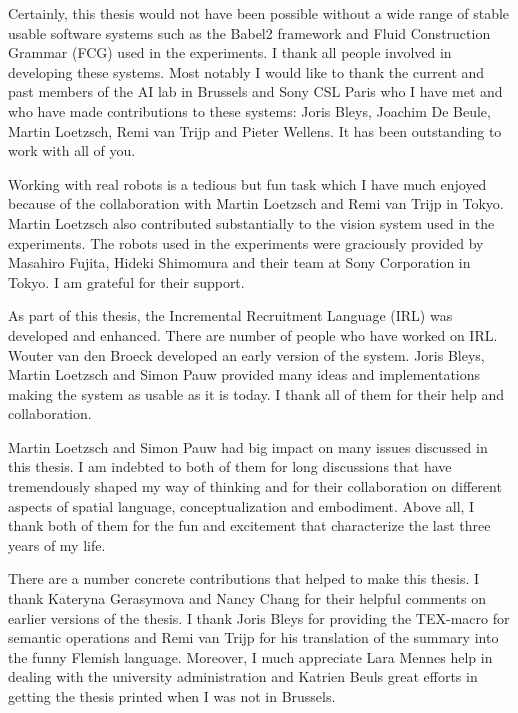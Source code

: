 

Certainly, this thesis would not have been possible without a
wide range of stable usable software systems such as
the Babel2 framework and Fluid Construction Grammar (FCG)
used in the experiments. I thank all people involved in developing these
systems. Most notably I would like to thank the current and past members
of the AI lab in Brussels and Sony CSL Paris who I have met
and who have made contributions to these systems: Joris Bleys,
Joachim De Beule, Martin Loetzsch, Remi van Trijp and Pieter Wellens. 
It has been outstanding to work with all of you.

Working with real robots is a tedious but fun task which I have 
much enjoyed because of the collaboration with Martin Loetzsch 
and Remi van Trijp in Tokyo. Martin Loetzsch also contributed
substantially to the vision system used in the experiments.
The robots used in the experiments were graciously provided
by Masahiro Fujita, Hideki Shimomura and their team at
Sony Corporation in Tokyo. I am grateful for their support.

As part of this thesis, the Incremental Recruitment Language (IRL) 
was developed and enhanced. There are number of people who have 
worked on IRL. Wouter van den Broeck developed an early version of the system.
Joris Bleys, Martin Loetzsch and Simon Pauw provided many
ideas and implementations making the system as usable as it is today.
I thank all of them for their help and collaboration.

Martin Loetzsch and Simon Pauw had big impact
on many issues discussed in this thesis. I am indebted to both
of them for long discussions that have tremendously shaped my way of thinking 
and for their collaboration on different aspects of spatial language, 
conceptualization and embodiment. Above all, I thank both of them 
for the fun and excitement that characterize the last three 
years of my life.

There are a number concrete contributions that
helped to make this thesis. I thank Kateryna Gerasymova
and Nancy Chang for their helpful comments on earlier versions of
the thesis. I thank Joris Bleys for providing the TEX-macro
for semantic operations and Remi van Trijp for his translation
of the summary into the funny Flemish language. Moreover, I much
appreciate Lara Mennes help in dealing with the university
administration and Katrien Beuls great efforts in getting the thesis
printed when I was not in Brussels. 

